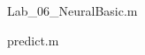 \documentclass[10pt, a4paper]{article}
\begin{document}
Lab\_06\_NeuralBasic.m


predict.m

\end{document}
